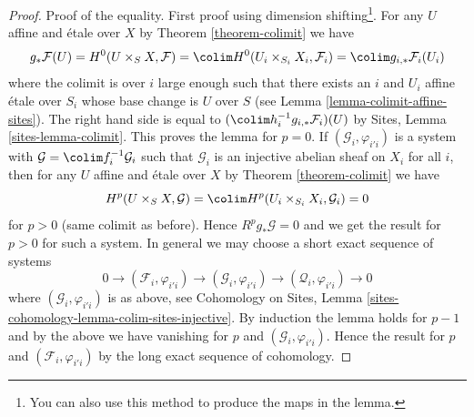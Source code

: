 \begin{proof}
\medskip\noindent
Proof of the equality. First proof using
dimension shifting\footnote{You can also use this method
to produce the maps in the lemma.}. For any
$U$ affine and \'etale over $X$ by Theorem \ref{theorem-colimit}
we have
$$
g_*\mathcal{F}(U) =
H^0(U \times_S X, \mathcal{F}) =
\colim H^0(U_i \times_{S_i} X_i, \mathcal{F}_i) =
\colim g_{i, *}\mathcal{F}_i(U_i)
$$
where the colimit is over $i$ large enough such that
there exists an $i$ and $U_i$ affine \'etale over $S_i$
whose base change is $U$ over $S$ (see
Lemma \ref{lemma-colimit-affine-sites}).
The right hand side is equal to
$(\colim h_i^{-1}g_{i, *}\mathcal{F}_i)(U)$ by
Sites, Lemma \ref{sites-lemma-colimit}.
This proves the lemma for $p = 0$.
If $(\mathcal{G}_i, \varphi_{i'i})$ is a system with
$\mathcal{G} = \colim f_i^{-1}\mathcal{G}_i$
such that $\mathcal{G}_i$ is an injective abelian sheaf on $X_i$
for all $i$, then for any $U$ affine and \'etale over $X$ by
Theorem \ref{theorem-colimit} we have
$$
H^p(U \times_S X, \mathcal{G}) =
\colim H^p(U_i \times_{S_i} X_i, \mathcal{G}_i) = 0
$$
for $p > 0$ (same colimit as before). Hence $R^pg_*\mathcal{G} = 0$
and we get the result for $p > 0$ for such a system.
In general we may choose a short exact sequence of systems
$$
0 \to (\mathcal{F}_i, \varphi_{i'i}) \to
(\mathcal{G}_i, \varphi_{i'i}) \to
(\mathcal{Q}_i, \varphi_{i'i}) \to 0
$$
where $(\mathcal{G}_i, \varphi_{i'i})$ is as above, see
Cohomology on Sites, Lemma
\ref{sites-cohomology-lemma-colim-sites-injective}.
By induction the lemma holds for $p - 1$ and by the above we have
vanishing for $p$ and $(\mathcal{G}_i, \varphi_{i'i})$.
Hence the result for $p$
and $(\mathcal{F}_i, \varphi_{i'i})$ by the long exact sequence
of cohomology.


\end{proof}
